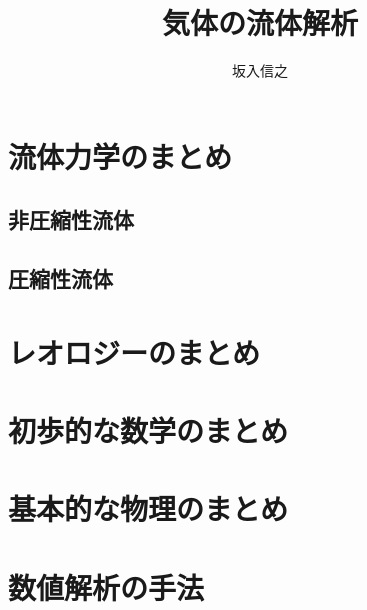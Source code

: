 \documentclass{jbook}
\author{坂入信之}
\title{気体の流体解析}
\begin{document}
\maketitle
\frontmatter

\tableofcontents

\mainmatter

\part{流体力学のまとめ}
\chapter{非圧縮性流体}


\chapter{圧縮性流体}






\part {レオロジーのまとめ}


\part{初歩的な数学のまとめ}





\part{基本的な物理のまとめ}



\part{数値解析の手法}





\appendix


\backmatter


\end{document}
